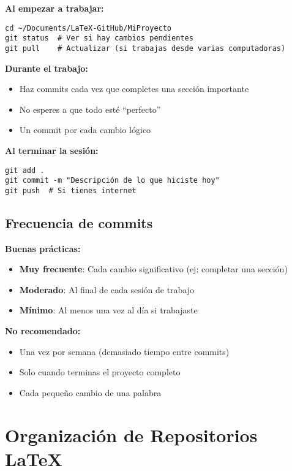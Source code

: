 \documentclass[12pt,a4paper]{article}
\begin{document}
\begin{successbox}
\textbf{Al empezar a trabajar:}
\begin{lstlisting}[style=bashstyle]
cd ~/Documents/LaTeX-GitHub/MiProyecto
git status  # Ver si hay cambios pendientes
git pull    # Actualizar (si trabajas desde varias computadoras)
\end{lstlisting}

\textbf{Durante el trabajo:}
\begin{itemize}
  \item Haz commits cada vez que completes una sección importante
  \item No esperes a que todo esté ``perfecto''
  \item Un commit por cada cambio lógico
\end{itemize}

\textbf{Al terminar la sesión:}
\begin{lstlisting}[style=bashstyle]
git add .
git commit -m "Descripción de lo que hiciste hoy"
git push  # Si tienes internet
\end{lstlisting}
\end{successbox}

\subsection{Frecuencia de commits}

\textbf{Buenas prácticas:}
\begin{itemize}
  \item \textbf{Muy frecuente}: Cada cambio significativo (ej: completar una sección)
  \item \textbf{Moderado}: Al final de cada sesión de trabajo
  \item \textbf{Mínimo}: Al menos una vez al día si trabajaste
\end{itemize}

\textbf{No recomendado:}
\begin{itemize}
  \item Una vez por semana (demasiado tiempo entre commits)
  \item Solo cuando terminas el proyecto completo
  \item Cada pequeño cambio de una palabra
\end{itemize}

\section{Organización de Repositorios LaTeX}
\end{document}
